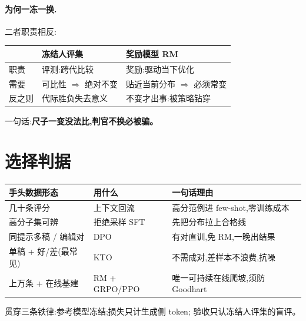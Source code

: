 \documentclass[UTF8, 11pt]{ctexart}
\begin{document}
\paragraph{为何一冻一换.} 二者职责相反:

\begin{center}
\begin{tabular}{@{}lll@{}}
\toprule
 & 冻结人评集 & 奖励模型 RM \\
\midrule
职责 & 评测:跨代比较 & 奖励:驱动当下优化 \\
需要 & 可比性 $\Rightarrow$ 绝对不变 & 贴近当前分布 $\Rightarrow$ 必须常变 \\
反之则 & 代际胜负失去意义 & 不变才出事:被策略钻穿 \\
\bottomrule
\end{tabular}
\end{center}

一句话:\textbf{尺子一变没法比,判官不换必被骗。}

\section{选择判据}

\begin{center}
\begin{tabular}{@{}p{}p{}p{}@{}}
\toprule
手头数据形态 & 用什么 & 一句话理由 \\
\midrule
几十条评分 & 上下文回流 & 高分范例进 few-shot,零训练成本 \\
高分子集可辨 & 拒绝采样 SFT & 先把分布拉上合格线 \\
同提示多稿 / 编辑对 & DPO & 有对直训,免 RM,一晚出结果 \\
单稿 + 好/差(最常见) & KTO & 不需成对,差样本不浪费,抗噪 \\
上万条 + 在线基建 & RM + GRPO/PPO & 唯一可持续在线爬坡,须防 Goodhart \\
\bottomrule
\end{tabular}
\end{center}

\vspace{0.5em}
\noindent 贯穿三条铁律:参考模型冻结;损失只计生成侧 token;
验收只认冻结人评集的盲评。
\end{document}
